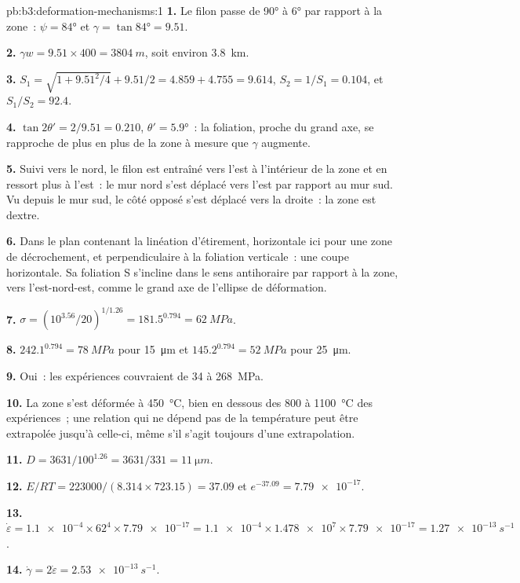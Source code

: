 \begin{solution}{pb:b3:deformation-mechanisms:1}
\textbf{1.} Le filon passe de \ang{90} à \ang{6} par rapport à la zone~: $\psi =
\ang{84}$ et $\gamma = \tan\ang{84} = 9.51$.

\textbf{2.} $\gamma w = 9.51\times400 = \qty{3804}{m}$, soit environ \qty{3.8}{km}.

\textbf{3.} $S_1 = \sqrt{1 + 9.51^2/4} + 9.51/2 = 4.859 + 4.755 = 9.614$,
$S_2 = 1/S_1 = 0.104$, et $S_1/S_2 = 92.4$.

\textbf{4.} $\tan2\theta' = 2/9.51 = 0.210$, $\theta' = \ang{5.9}$~: la
foliation, proche du grand axe, se rapproche de plus en plus de la zone à mesure que $\gamma$
augmente.

\textbf{5.} Suivi vers le nord, le filon est entraîné vers l'est à l'intérieur de la zone et
en ressort plus à l'est~: le mur nord s'est déplacé vers l'est par rapport au mur sud.
Vu depuis le mur sud, le côté opposé s'est déplacé vers la droite~: la zone est
dextre.

\textbf{6.} Dans le plan contenant la linéation d'étirement, horizontale ici
pour une zone de décrochement, et perpendiculaire à la foliation verticale~: une
coupe horizontale. Sa foliation S s'incline dans le sens antihoraire par rapport à la zone, vers
l'est-nord-est, comme le grand axe de l'ellipse de déformation.

\textbf{7.} $\sigma = (10^{3.56}/20)^{1/1.26} = 181.5^{0.794} = \qty{62}{MPa}$.

\textbf{8.} $242.1^{0.794} = \qty{78}{MPa}$ pour \qty{15}{\micro m} et
$145.2^{0.794} = \qty{52}{MPa}$ pour \qty{25}{\micro m}.

\textbf{9.} Oui~: les expériences couvraient de 34 à \qty{268}{MPa}.

\textbf{10.} La zone s'est déformée à \qty{450}{\celsius}, bien en dessous des 800 à
\qty{1100}{\celsius} des expériences~; une relation qui ne dépend pas de la
température peut être extrapolée jusqu'à celle-ci, même s'il s'agit toujours
d'une extrapolation.

\textbf{11.} $D = 3631/100^{1.26} = 3631/331 = \qty{11}{\micro m}$.

\textbf{12.} $E/RT = 223000/(8.314\times723.15) = 37.09$ et $e^{-37.09} =
\num{7.79e-17}$.

\textbf{13.} $\dot\varepsilon = \num{1.1e-4}\times62^4\times\num{7.79e-17} =
\num{1.1e-4}\times\num{1.478e7}\times\num{7.79e-17} = \qty{1.27e-13}{s^{-1}}$.

\textbf{14.} $\dot\gamma = 2\dot\varepsilon = \qty{2.53e-13}{s^{-1}}$.


\end{solution}
